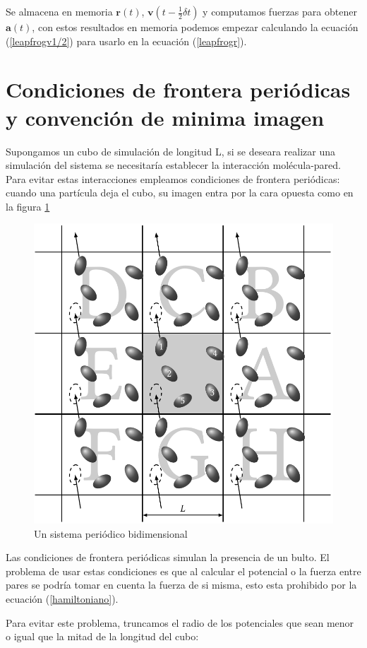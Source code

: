 Se almacena en memoria $\mathbf{r}(t)$, $\mathbf{v}(t - \frac{1}{2}\delta t)$ y computamos fuerzas para obtener $\mathbf{a}(t)$, con estos resultados en memoria podemos empezar calculando la ecuación (\ref{leapfrogv1/2}) para usarlo en la ecuación (\ref{leapfrogr}).

\section{Condiciones de frontera periódicas y convención de minima imagen}

Supongamos un cubo de simulación de longitud L, si se deseara realizar una simulación del sistema se necesitaría establecer la interacción molécula-pared. Para evitar estas interacciones empleamos condiciones de frontera periódicas: cuando una partícula deja el cubo, su imagen entra por la cara opuesta como en la figura \ref{fig:PBC}

\begin{figure}[!h]
    \centering
    \includegraphics[width=.7\textwidth,keepaspectratio=true]{PBC.png}
    \caption{Un sistema periódico bidimensional \cite{Allen2017}}
    \label{fig:PBC}
\end{figure}

Las condiciones de frontera periódicas simulan la presencia de un bulto. El problema de usar estas condiciones es que al calcular el potencial o la fuerza entre pares se podría tomar en cuenta la fuerza de si misma, esto esta prohibido por la ecuación (\ref{hamiltoniano}).

Para evitar este problema, truncamos el radio de los potenciales que sean menor o igual que la mitad de la longitud del cubo:

